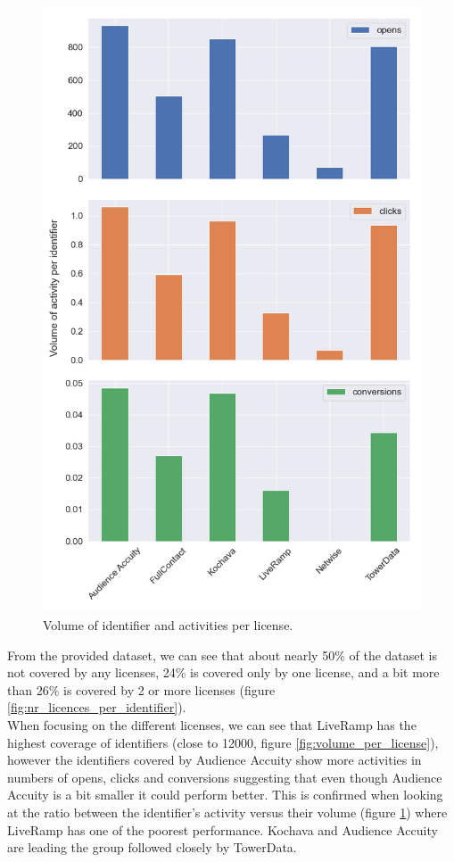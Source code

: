 \documentclass[11pt]{article} %
\begin{document}
\begin{figure}[h!]
  \includegraphics[width=0.8\linewidth]{../outputs/volume_per_identifier_per_license.png}
  \caption{Volume of identifier and activities per license.}
  \label{fig:volume_per_id_per_license}
\end{figure}

From the provided dataset, we can see that about nearly 50\% of the dataset is not covered by any licenses, 24\% is covered only by one license, and a bit more than 26\% is covered by 2 or more licenses (figure \ref{fig:nr_licences_per_identifier}).\\

When focusing on the different licenses, we can see that LiveRamp has the highest coverage of identifiers (close to 12000, figure \ref{fig:volume_per_license}), however the identifiers covered by Audience Accuity show more activities in numbers of opens, clicks and conversions suggesting that even though Audience Accuity is a bit smaller it could perform better. This is confirmed when looking at the ratio between the identifier's activity versus their volume (figure \ref{fig:volume_per_id_per_license}) where LiveRamp has one of the poorest performance. Kochava and Audience Accuity are leading the group followed closely by TowerData.\\
\end{document}
